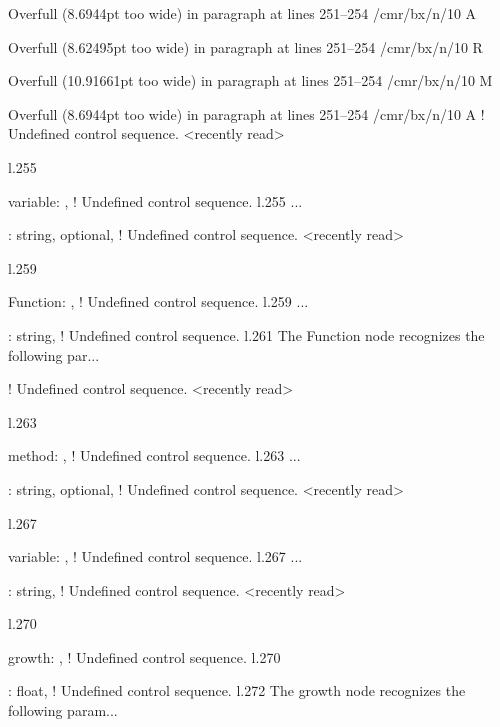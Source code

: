 {{{{{{{{{{{Overfull \hbox (8.6944pt too wide) in paragraph at lines 251--254
/cmr/bx/n/10 A

Overfull \hbox (8.62495pt too wide) in paragraph at lines 251--254
/cmr/bx/n/10 R

Overfull \hbox (10.91661pt too wide) in paragraph at lines 251--254
/cmr/bx/n/10 M

Overfull \hbox (8.6944pt too wide) in paragraph at lines 251--254
/cmr/bx/n/10 A
! Undefined control sequence.
<recently read> \xmlAttr 
                         
l.255                   \item \xmlAttr
                                      {variable}: ,
! Undefined control sequence.
l.255 ...       \item {}: \xmlDesc
                                                  {string, optional},
! Undefined control sequence.
<recently read> \xmlNode 
                         
l.259             \item \xmlNode
                                {Function}: ,
! Undefined control sequence.
l.259 ...       \item {}: \xmlDesc
                                                  {string},
! Undefined control sequence.
l.261               The \xmlNode
                                {Function} node recognizes the following par...

! Undefined control sequence.
<recently read> \xmlAttr 
                         
l.263                   \item \xmlAttr
                                      {method}: ,
! Undefined control sequence.
l.263 ...         \item {}: \xmlDesc
                                                  {string, optional},
! Undefined control sequence.
<recently read> \xmlNode 
                         
l.267             \item \xmlNode
                                {variable}: ,
! Undefined control sequence.
l.267 ...       \item {}: \xmlDesc
                                                  {string},
! Undefined control sequence.
<recently read> \xmlNode 
                         
l.270             \item \xmlNode
                                {growth}: ,
! Undefined control sequence.
l.270             \item {}: \xmlDesc
                                                  {float},
! Undefined control sequence.
l.272               The \xmlNode
                                {growth} node recognizes the following param...

}}}}}}}}}}}
